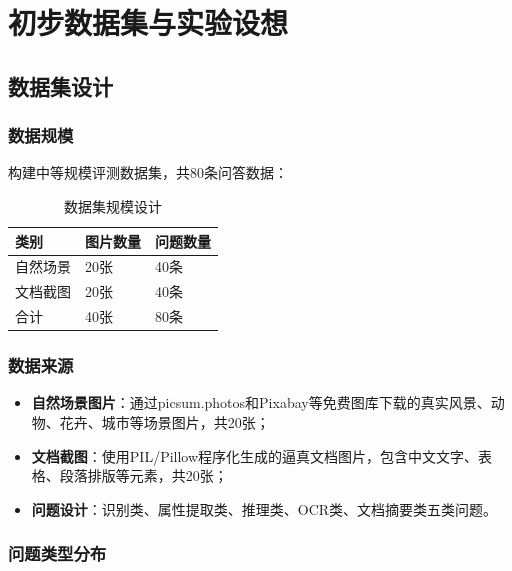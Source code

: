 
\chapter{初步数据集与实验设想}
\label{cha:dataset_experiment}

\section{数据集设计}
\label{sec:dataset}

\subsection{数据规模}

构建中等规模评测数据集，共80条问答数据：

\begin{table}[htbp]
  \centering
  \caption{数据集规模设计}
  \label{tab:dataset_scale}
  \begin{tabular}{|l|l|l|}
    \hline
    \textbf{类别} & \textbf{图片数量} & \textbf{问题数量} \\
    \hline
    自然场景 & 20张 & 40条 \\
    \hline
    文档截图 & 20张 & 40条 \\
    \hline
    合计 & 40张 & 80条 \\
    \hline
  \end{tabular}
\end{table}

\subsection{数据来源}

\begin{itemize}
  \item \textbf{自然场景图片}：通过picsum.photos和Pixabay等免费图库下载的真实风景、动物、花卉、城市等场景图片，共20张；
  \item \textbf{文档截图}：使用PIL/Pillow程序化生成的逼真文档图片，包含中文文字、表格、段落排版等元素，共20张；
  \item \textbf{问题设计}：识别类、属性提取类、推理类、OCR类、文档摘要类五类问题。
\end{itemize}

\subsection{问题类型分布}


